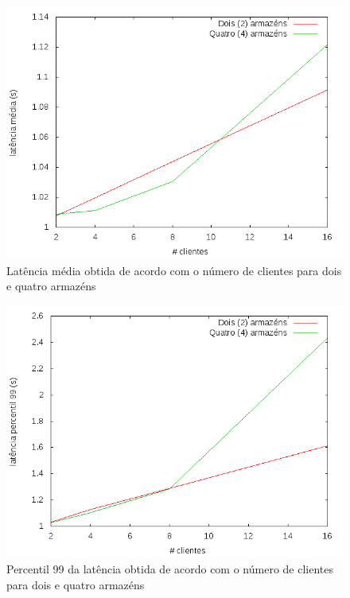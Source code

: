 \begin{figure}[!h]
\centering
\includegraphics[scale=.4]{img/questao-1/rep-read-lat-med}
\caption{Latência média obtida de acordo com o número de clientes para dois e quatro armazéns}
\end{figure}


\begin{figure}[!h]
\centering
\includegraphics[scale=.4]{img/questao-1/rep-read-lat-pct99}
\caption{Percentil 99 da latência obtida de acordo com o número de clientes para dois e quatro armazéns}
\end{figure}

\newpage

